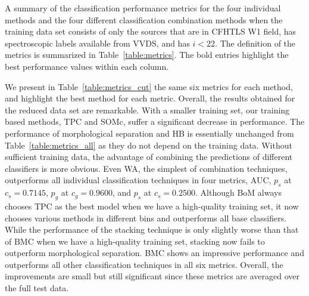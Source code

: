 \documentclass[useAMS,usenatbib]{mn2e}
\begin{document}
\begin{table}
  \caption{A summary of the classification performance metrics
           for the four individual methods
           and the four different classification combination methods
           when the training data set consists of
           only the sources that are in CFHTLS W1 field,
           has spectroscopic labels available from VVDS,
           and has $i < 22$.
           The definition of the metrics is summarized in
           Table~\ref{table:metrics}.
           The bold entries highlight the best performance values
           within each column.}
  \centering
  
  \label{table:metrics_cut}
\end{table}

We present in Table~\ref{table:metrics_cut}
the same six metrics for each method,
and highlight the best method for each metric.
Overall, the results obtained for the reduced data set are remarkable.
With a smaller training set, our training based methods, TPC and SOMc,
suffer a significant decrease in performance.
The performance of morphological separation and HB
is essentially unchanged from Table~\ref{table:metrics_all}
as they do not depend on the training data.
Without sufficient training data,
the advantage of combining the predictions of different classifiers
is more obvious.
Even WA, the simplest of combination techniques, outperforms
all individual classification techniques in four metrics,
AUC, $p_s$ at $c_s=0.7145$, $p_g$ at $c_g=0.9600$, and $p_s$ at $c_s=0.2500$.
Although BoM always chooses TPC as the best model
when we have a high-quality training set,
it now chooses various methods in different bins
and outperforms all base classifiers.
While the performance of the stacking technique is only slightly worse
than that of BMC when we have a high-quality training set,
stacking now fails to outperform morphological separation.
BMC shows an impressive performance and 
outperforms all other classification techniques in all six metrics.
Overall, the improvements are small but still significant
since these metrics are averaged over the full test data.

\end{document}
